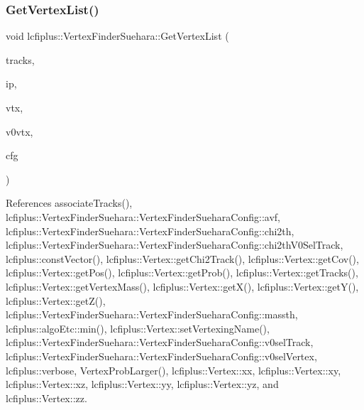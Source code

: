 \subsubsection{Get\+Vertex\+List()}
{\footnotesize\ttfamily void lcfiplus\+::\+Vertex\+Finder\+Suehara\+::\+Get\+Vertex\+List (\begin{DoxyParamCaption}\item[{list$<$ const \textbf{ Track} $\ast$$>$ \&}]{tracks,  }\item[{const \textbf{ Vertex} $\ast$}]{ip,  }\item[{vector$<$ \textbf{ Vertex} $\ast$$>$ \&}]{vtx,  }\item[{vector$<$ \textbf{ Vertex} $\ast$$>$ \&}]{v0vtx,  }\item[{\textbf{ Vertex\+Finder\+Suehara\+Config} \&}]{cfg }\end{DoxyParamCaption})}



References associate\+Tracks(), lcfiplus\+::\+Vertex\+Finder\+Suehara\+::\+Vertex\+Finder\+Suehara\+Config\+::avf, lcfiplus\+::\+Vertex\+Finder\+Suehara\+::\+Vertex\+Finder\+Suehara\+Config\+::chi2th, lcfiplus\+::\+Vertex\+Finder\+Suehara\+::\+Vertex\+Finder\+Suehara\+Config\+::chi2th\+V0\+Sel\+Track, lcfiplus\+::const\+Vector(), lcfiplus\+::\+Vertex\+::get\+Chi2\+Track(), lcfiplus\+::\+Vertex\+::get\+Cov(), lcfiplus\+::\+Vertex\+::get\+Pos(), lcfiplus\+::\+Vertex\+::get\+Prob(), lcfiplus\+::\+Vertex\+::get\+Tracks(), lcfiplus\+::\+Vertex\+::get\+Vertex\+Mass(), lcfiplus\+::\+Vertex\+::get\+X(), lcfiplus\+::\+Vertex\+::get\+Y(), lcfiplus\+::\+Vertex\+::get\+Z(), lcfiplus\+::\+Vertex\+Finder\+Suehara\+::\+Vertex\+Finder\+Suehara\+Config\+::massth, lcfiplus\+::algo\+Etc\+::min(), lcfiplus\+::\+Vertex\+::set\+Vertexing\+Name(), lcfiplus\+::\+Vertex\+Finder\+Suehara\+::\+Vertex\+Finder\+Suehara\+Config\+::v0sel\+Track, lcfiplus\+::\+Vertex\+Finder\+Suehara\+::\+Vertex\+Finder\+Suehara\+Config\+::v0sel\+Vertex, lcfiplus\+::verbose, Vertex\+Prob\+Larger(), lcfiplus\+::\+Vertex\+::xx, lcfiplus\+::\+Vertex\+::xy, lcfiplus\+::\+Vertex\+::xz, lcfiplus\+::\+Vertex\+::yy, lcfiplus\+::\+Vertex\+::yz, and lcfiplus\+::\+Vertex\+::zz.

\mbox{\label{namespacelcfiplus_1_1VertexFinderSuehara_afd9aaa6fba7bad0dfd0bc3c4f6b2a67b}} 
